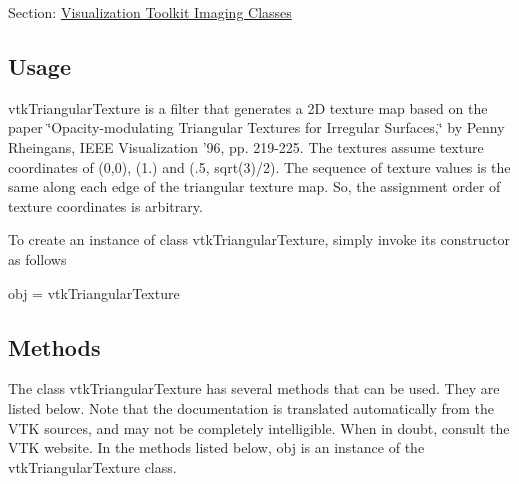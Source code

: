 Section\-: \hyperlink{sec_vtkimaging}{Visualization Toolkit Imaging Classes} \hypertarget{vtkwidgets_vtkxyplotwidget_Usage}{}\subsection{Usage}\label{vtkwidgets_vtkxyplotwidget_Usage}
vtk\-Triangular\-Texture is a filter that generates a 2\-D texture map based on the paper \char`\"{}\-Opacity-\/modulating Triangular Textures for Irregular Surfaces,\char`\"{} by Penny Rheingans, I\-E\-E\-E Visualization '96, pp. 219-\/225. The textures assume texture coordinates of (0,0), (1.) and (.5, sqrt(3)/2). The sequence of texture values is the same along each edge of the triangular texture map. So, the assignment order of texture coordinates is arbitrary.

To create an instance of class vtk\-Triangular\-Texture, simply invoke its constructor as follows \begin{DoxyVerb}  obj = vtkTriangularTexture
\end{DoxyVerb}
 \hypertarget{vtkwidgets_vtkxyplotwidget_Methods}{}\subsection{Methods}\label{vtkwidgets_vtkxyplotwidget_Methods}
The class vtk\-Triangular\-Texture has several methods that can be used. They are listed below. Note that the documentation is translated automatically from the V\-T\-K sources, and may not be completely intelligible. When in doubt, consult the V\-T\-K website. In the methods listed below, {\ttfamily obj} is an instance of the vtk\-Triangular\-Texture class. 

